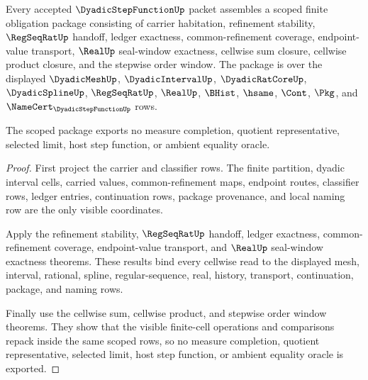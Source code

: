 \begin{theorem}
\label{thm:dyadic-step-function-scoped-obligation-package}
Every accepted $\DyadicStepFunctionUp$ packet assembles a scoped finite obligation package consisting of carrier habitation, refinement stability, $\RegSeqRatUp$ handoff, ledger exactness, common-refinement coverage, endpoint-value transport, $\RealUp$ seal-window exactness, cellwise sum closure, cellwise product closure, and the stepwise order window. The package is over the displayed $\DyadicMeshUp$, $\DyadicIntervalUp$, $\DyadicRatCoreUp$, $\DyadicSplineUp$, $\RegSeqRatUp$, $\RealUp$, $\BHist$, $\hsame$, $\Cont$, $\Pkg$, and $\NameCert_{\DyadicStepFunctionUp}$ rows.

The scoped package exports no measure completion, quotient representative, selected limit, host step function, or ambient equality oracle.
\end{theorem}
\begin{proof}
First project the carrier and classifier rows. The finite partition, dyadic interval cells, carried values, common-refinement maps, endpoint routes, classifier rows, ledger entries, continuation rows, package provenance, and local naming row are the only visible coordinates.

Apply the refinement stability, $\RegSeqRatUp$ handoff, ledger exactness, common-refinement coverage, endpoint-value transport, and $\RealUp$ seal-window exactness theorems. These results bind every cellwise read to the displayed mesh, interval, rational, spline, regular-sequence, real, history, transport, continuation, package, and naming rows.

Finally use the cellwise sum, cellwise product, and stepwise order window theorems. They show that the visible finite-cell operations and comparisons repack inside the same scoped rows, so no measure completion, quotient representative, selected limit, host step function, or ambient equality oracle is exported.
\end{proof}

